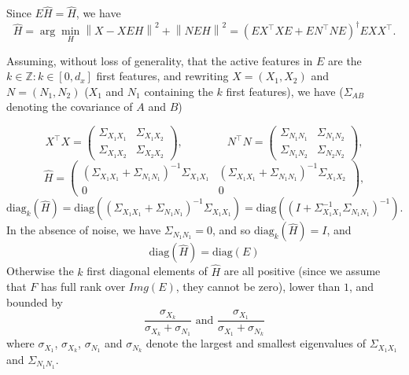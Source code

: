 \documentclass{article}
\begin{document}
Since  $E\hat H = \hat H$, we have
\begin{equation}
  \hat H = \arg \min_H  \left \| X - XEH\right\| ^2  + \left \| NEH\right \| ^2 = (E X^\top XE +EN^\top NE) ^\dagger EXX^\top.
\end{equation}

Assuming, without loss of generality, that the active features in $E$ are the $k \in \mathbb{Z}: k \in [0, d_x]$ first features, and rewriting $X=(X_1,X_2)$ and $N=(N_1,N_2)$ ($X_1$ and $N_1$ containing the $k$ first features), we have ($\Sigma_{A B}$ denoting the covariance of $A$ and $B$)

\begin{equation}
  X^\top X = \left(\begin{array}{lccl}\Sigma_{X_1 X_1} & \Sigma_{X_1 X_2} \\ \Sigma_{X_1 X_2} & \Sigma_{X_2 X_2}\end{array}\right),\qquad\qquad N^\top N = \left(\begin{array}{lccl}\Sigma_{N_1 N_1} & \Sigma_{N_1 N_2} \\ \Sigma_{N_1 N_2} & \Sigma_{N_2 N_2}\end{array}\right),
\end{equation}
\begin{equation}
  \hat H = \left(\begin{array}{cc}(\Sigma_{X_1 X_1}+\Sigma_{N_1 N_1})^{-1}\Sigma_{X_1 X_1} & (\Sigma_{X_1 X_1}+\Sigma_{N_1 N_1})^{-1}\Sigma_{X_1 X_2} \\0 & 0\end{array}\right),
\end{equation}
\begin{equation}
  \text{diag}_k (\hat H) = \text{diag}((\Sigma_{X_1 X_1}+\Sigma_{N_1 N_1})^{-1}\Sigma_{X_1 X_1}) = \text{diag}((I+\Sigma_{X_1 X_1}^{-1}\Sigma_{N_1 N_1})^{-1}).
\end{equation}
%
%
In the absence of noise, we have $\Sigma_{N_1 N_1}=0$, and so $\text{diag}_k(\hat H)=I$, and $$\text{diag}(\hat H) = \text{diag}(E)$$
Otherwise the $k$ first diagonal elements of $\hat H$ are all positive (since we assume that $F$ has full rank over $Img(E)$, they cannot be zero), lower than $1$, and bounded by
$$\frac{\sigma_{X_k}}{\sigma_{X_k} +\sigma_{N_1}} \text{ and }  \frac{\sigma_{X_1}}{\sigma_{X_1} +\sigma_{N_k}}$$where  $\sigma_{X_1}$, $\sigma_{X_k}$, $\sigma_{N_1}$ and $\sigma_{N_k}$ denote the largest and smallest eigenvalues of $\Sigma_{X_1 X_1}$ and $\Sigma_{N_1 N_1}$.
\end{document}
